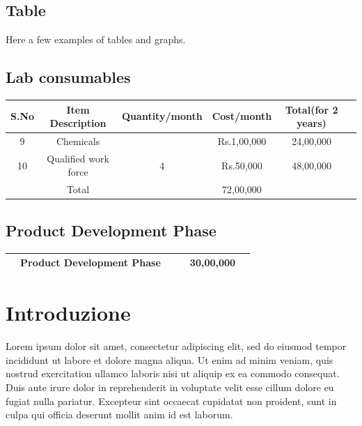\documentclass{FR16}
\begin{document}
\subsection{Table }
Here a few examples of tables and graphs.
\subsection{Lab consumables}
\begin{center}
\begin{tabular}{c c c c c c}
\arrayrulecolor{Azzurro}
\hline
{\bfseries S.No} & {\bfseries Item Description}& {\bfseries Quantity/month} & {\bfseries Cost/month}& {\bfseries Total(for 2 years)} \\

\hline 
9 &Chemicals & & Rs.1,00,000 & 24,00,000\\   
\hline
10& Qualified work force &  4 & Rs.50,000 & 48,00,000\\
\hline
 & Total & & 72,00,000
\end{tabular}
\end{center}

\subsection{Product Development Phase}
\begin{center}
\begin{tabular}{c c c c c c}
\arrayrulecolor{Azzurro}
\hline
{\bfseries  } & {\bfseries Product Development Phase}& {\bfseries } & {\bfseries }& {\bfseries 30,00,000} \\
\hline
\end{tabular}
\end{center}


% 
%









\section{Introduzione}
Lorem ipsum dolor sit amet, consectetur adipiscing elit, sed do eiusmod tempor incididunt ut labore et dolore magna aliqua. Ut enim ad minim veniam, quis nostrud exercitation ullamco laboris nisi ut aliquip ex ea commodo consequat. Duis aute irure dolor in reprehenderit in voluptate velit esse cillum dolore eu fugiat nulla pariatur. Excepteur sint occaecat cupidatat non proident, sunt in culpa qui officia deserunt mollit anim id est laborum.
\newpage
\end{document}
